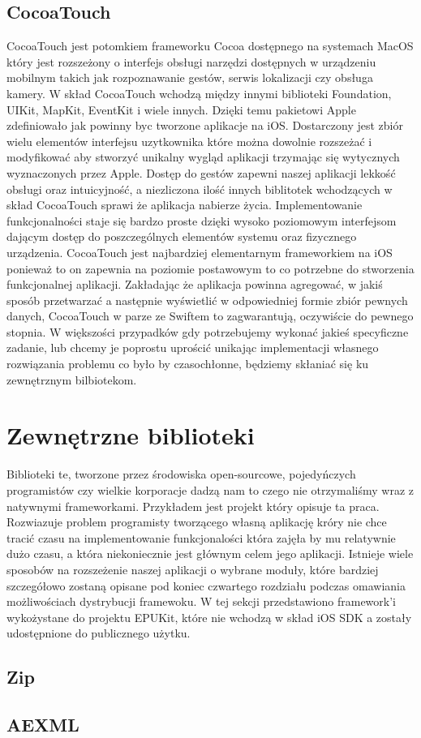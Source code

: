 \subsection*{CocoaTouch}

CocoaTouch jest potomkiem frameworku Cocoa dostępnego na systemach MacOS który jest rozszeżony o interfejs obsługi narzędzi dostępnych
w urządzeniu mobilnym takich jak rozpoznawanie gestów, serwis lokalizacji czy obsługa kamery. W skład CocoaTouch wchodzą
między innymi biblioteki Foundation, UIKit, MapKit, EventKit i wiele innych. Dzięki temu pakietowi Apple zdefiniowało jak powinny byc
tworzone aplikacje na iOS. Dostarczony jest zbiór wielu elementów interfejsu uzytkownika które można dowolnie rozszeżać i modyfikować
aby stworzyć unikalny wygląd aplikacji trzymając się wytycznych wyznaczonych przez Apple. Dostęp do gestów zapewni naszej aplikacji
lekkość obsługi oraz intuicyjność, a niezliczona ilość innych biblitotek wchodzących w skład CocoaTouch sprawi że aplikacja nabierze życia.
Implementowanie funkcjonalności staje się bardzo proste dzięki wysoko poziomowym interfejsom dającym dostęp do poszczególnych elementów
systemu oraz fizycznego urządzenia. CocoaTouch jest najbardziej elementarnym frameworkiem na iOS ponieważ to on zapewnia na poziomie
postawowym to co potrzebne do stworzenia funkcjonalnej aplikacji. Zakładając że aplikacja powinna agregować, w jakiś sposób przetwarzać
a następnie wyświetlić w odpowiedniej formie zbiór pewnych danych, CocoaTouch w parze ze Swiftem to zagwarantują, oczywiście do pewnego
stopnia. W większości przypadków gdy potrzebujemy wykonać jakieś specyficzne zadanie, lub chcemy je poprostu uprościć unikając
implementacji własnego rozwiązania problemu co było by czasochłonne, będziemy skłaniać się ku zewnętrznym bilbiotekom.

\section{Zewnętrzne biblioteki}

Biblioteki te, tworzone przez środowiska open-sourcowe, pojedyńczych programistów czy wielkie korporacje dadzą nam to czego
nie otrzymaliśmy wraz z natywnymi frameworkami. Przykładem jest projekt który opisuje ta praca. Rozwiazuje problem programisty
tworzącego własną aplikację króry nie chce tracić czasu na implementowanie funkcjonalości która zajęła by mu relatywnie dużo czasu,
a która niekoniecznie jest głównym celem jego aplikacji. Istnieje wiele sposobów na rozszeżenie naszej aplikacji o wybrane moduły,
które bardziej szczegółowo zostaną opisane pod koniec czwartego rozdziału podczas omawiania możliwościach dystrybucji framewoku.
W tej sekcji przedstawiono framework'i wykożystane do projektu EPUKit, które nie wchodzą w skład iOS SDK a zostały udostępnione do
publicznego użytku.

\subsection*{Zip}

\subsection*{AEXML}
